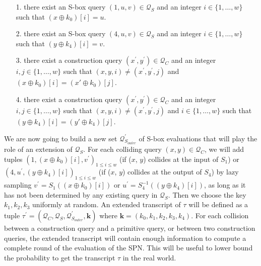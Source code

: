 \begin{itemize}
  \item[1.]
  there exist an S-box query $(1, u, v) \in \mathcal{Q}_{S}$ and an integer $i \in\{1, \ldots, w\}$ such that $\left(x \oplus k_{0}\right)[i]=u$.
  \item[2.]
  there exist an S-box query $(4, u, v) \in \mathcal{Q}_{S}$ and an integer $i \in\{1, \ldots, w\}$ such that $\left(y \oplus k_{4}\right)[i]=v$.
  \item[3.]
  there exist a construction query $\left(x^{\prime}, y^{\prime}\right) \in \mathcal{Q}_{C}$ and an integer $i,j \in\{1, \ldots, w\}$ such that $(x, y, i) \neq\left(x^{\prime}, y^{\prime}, j\right)$ and $\left(x \oplus k_{0}\right)[i] = \left(x' \oplus k_{0}\right)[j]$.
  \item[4.]
  there exist a construction query $\left(x^{\prime}, y^{\prime}\right) \in \mathcal{Q}_{C}$ and an integer $i,j \in\{1, \ldots, w\}$ such that $(x, y, i) \neq\left(x^{\prime}, y^{\prime}, j\right)$ and $i \in\{1, \ldots, w\}$ such that $\left(y \oplus k_{4}\right)[i] = \left(y' \oplus k_{4}\right)[j]$.
\end{itemize}

We are now going to build a new set $\mathcal{Q}_{S_{outer}}^{\prime}$ of S-box evaluations that will play the role of an extension of $\mathcal{Q}_{S}$. For each colliding query $(x, y) \in \mathcal{Q}_{C}$, we will add tuples $\left(1, \left(x \oplus k_{0}\right)[i], v^{\prime}\right)_{1 \leq i \leq w}$ (if ($\mathit{x}$, $\mathit{y}$) collides at the input of $S_1$) or $\left(4, u^{\prime}, \left(y \oplus k_{4}\right)[i]\right)_{1 \leq i \leq w}$ (if ($\mathit{x}$, $\mathit{y}$) collides at the output of $S_4$) by lazy sampling $v^{\prime}=S_{1}(\left(x \oplus k_{0}\right)[i])$ or $u^{\prime}=S_{4}^{-1}(\left(y \oplus k_{4}\right)[i])$, as long as it has not been determined by any existing query in $\mathcal{Q}_{S}$. Then we choose the key $k_1, k_2, k_3$ uniformly at random. An extended transcript of $\tau$ will be defined as a tuple $\tau^{\prime}=\left(\mathcal{Q}_{C}, \mathcal{Q}_{S}, \mathcal{Q}_{S_{outer}}^{\prime}, \mathbf{k}\right)$ where $\mathbf{k}=\left(k_{0}, k_{1}, k_{2},k_{3},k_{4}\right)$. For each collision between a construction query and a primitive query, or between two construction queries, the extended transcript will contain enough information to compute a complete round of the evaluation of the SPN. This will be useful to lower bound the probability to get the transcript $\tau$ in the real world.\\

